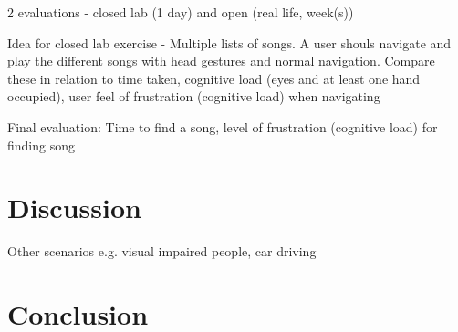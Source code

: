 \documentclass{article}
\begin{document}
2 evaluations - closed lab (1 day) and open (real life, week(s))

Idea for closed lab exercise - Multiple lists of songs. A user shouls navigate and play the different songs with head gestures and normal navigation. Compare these in relation to time taken, cognitive load (eyes and at least one hand occupied), user feel of frustration (cognitive load) when navigating

Final evaluation: Time to find a song, level of frustration (cognitive load) for finding song

\section{Discussion}
Other scenarios e.g. visual impaired people, car driving


\section{Conclusion}



\clearpage



\end{document}
